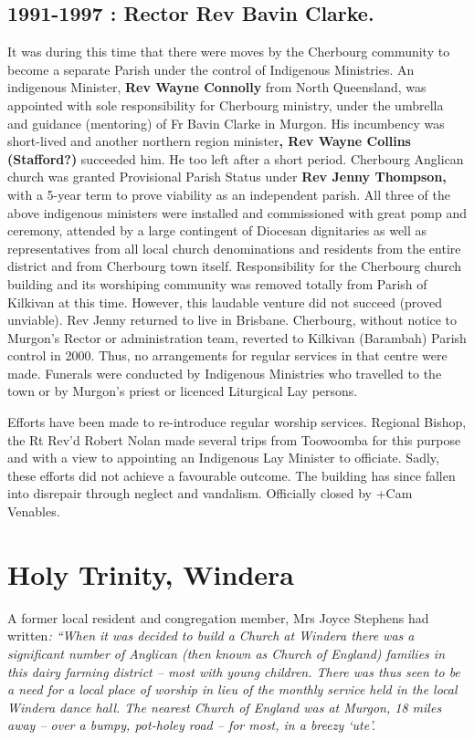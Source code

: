 \subsection{1991-1997 : Rector Rev Bavin
Clarke.}

It was during this time that there were moves by the Cherbourg community
to become a separate Parish under the control of Indigenous Ministries.
An indigenous Minister, \textbf{Rev Wayne Connolly} from North
Queensland, was appointed with sole responsibility for Cherbourg
ministry, under the umbrella and guidance (mentoring) of Fr Bavin Clarke
in Murgon. His incumbency was short-lived and another northern region
minister\textbf{, Rev Wayne Collins (Stafford?)} succeeded him. He too
left after a short period. Cherbourg Anglican church was granted
Provisional Parish Status under \textbf{Rev Jenny Thompson,} with a
5-year term to prove viability as an independent parish. All three of
the above indigenous ministers were installed and commissioned with
great pomp and ceremony, attended by a large contingent of Diocesan
dignitaries as well as representatives from all local church
denominations and residents from the entire district and from Cherbourg
town itself. Responsibility for the Cherbourg church building and its
worshiping community was removed totally from Parish of Kilkivan at this
time. However, this laudable venture did not succeed (proved unviable).
Rev Jenny returned to live in Brisbane. Cherbourg, without notice to
Murgon's Rector or administration team, reverted to Kilkivan (Barambah)
Parish control in 2000. Thus, no arrangements for regular services in
that centre were made. Funerals were conducted by Indigenous Ministries
who travelled to the town or by Murgon's priest or licenced Liturgical
Lay persons.

Efforts have been made to re-introduce regular worship services.
Regional Bishop, the Rt Rev'd Robert Nolan made several trips from
Toowoomba for this purpose and with a view to appointing an Indigenous
Lay Minister to officiate. Sadly, these efforts did not achieve a
favourable outcome. The building has since fallen into disrepair through
neglect and vandalism. Officially closed by +Cam Venables.

\section{Holy Trinity, Windera}

A former local resident and congregation member, Mrs Joyce Stephens had
written\emph{: ``When it was decided to build a Church at Windera there
was a significant number of Anglican (then known as Church of England)
families in this dairy farming district -- most with young children.
There was thus seen to be a need for a local place of worship in lieu of
the monthly service held in the local Windera dance hall. The nearest
Church of England was at Murgon, 18 miles away -- over a bumpy,
pot-holey road -- for most, in a breezy `ute'.}

